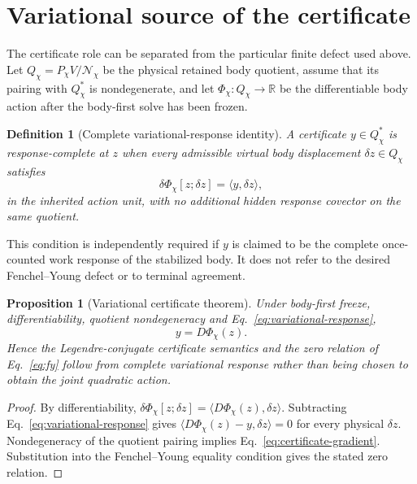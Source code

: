 \documentclass[11pt]{article}
\newtheorem{definition}{Definition}
\newtheorem{proposition}{Proposition}
\begin{document}
\section{Variational source of the certificate}

The certificate role can be separated from the particular finite defect used
above.  Let \(Q_\chi=P_\chi V/\mathcal N_\chi\) be the physical retained body
quotient, assume that its pairing with \(Q_\chi^*\) is nondegenerate, and let
\(\Phi_\chi:Q_\chi\to\mathbb R\) be the differentiable body action after the
body-first solve has been frozen.

\begin{definition}[Complete variational-response identity]
A certificate \(y\in Q_\chi^*\) is response-complete at \(z\) when every
admissible virtual body displacement \(\delta z\in Q_\chi\) satisfies
\begin{equation}
 \delta\Phi_\chi[z;\delta z]=\langle y,\delta z\rangle,
 \label{eq:variational-response}
\end{equation}
in the inherited action unit, with no additional hidden response covector on
the same quotient.
\end{definition}

This condition is independently required if \(y\) is claimed to be the
complete once-counted work response of the stabilized body.  It does not refer
to the desired Fenchel--Young defect or to terminal agreement.

\begin{proposition}[Variational certificate theorem]
Under body-first freeze, differentiability, quotient nondegeneracy and
Eq.~\eqref{eq:variational-response},
\begin{equation}
 y=D\Phi_\chi(z).
 \label{eq:certificate-gradient}
\end{equation}
Hence the Legendre-conjugate certificate semantics and the zero relation of
Eq.~\eqref{eq:fy} follow from complete variational response rather than being
chosen to obtain the joint quadratic action.
\end{proposition}

\begin{proof}
By differentiability,
\(\delta\Phi_\chi[z;\delta z]=\langle D\Phi_\chi(z),\delta z\rangle\).
Subtracting Eq.~\eqref{eq:variational-response} gives
\(\langle D\Phi_\chi(z)-y,\delta z\rangle=0\) for every physical
\(\delta z\).  Nondegeneracy of the quotient pairing implies
Eq.~\eqref{eq:certificate-gradient}.  Substitution into the
Fenchel--Young equality condition gives the stated zero relation.
\end{proof}
\end{document}
